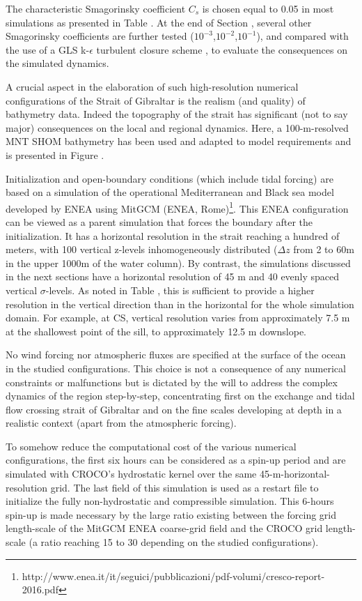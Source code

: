 The characteristic Smagorinsky coefficient $C_s$ is chosen equal to 0.05 in most simulations as presented in Table . At the end of Section , several other Smagorinsky coefficients are further tested  ($10^{-3}$,$10^{-2}$,$10^{-1}$), and compared with the use of a GLS k-$\epsilon$ turbulent closure scheme \citep{umlauf_2003}, to evaluate the consequences on the simulated dynamics.

A crucial aspect in the elaboration of such high-resolution numerical configurations of the Strait of Gibraltar is the realism (and quality) of bathymetry data. Indeed the topography of the strait has significant (not to say major) consequences on the local and regional dynamics. Here, a 100-m-resolved MNT SHOM bathymetry has been used and adapted to model requirements and is presented in Figure .

Initialization and open-boundary conditions (which include tidal forcing) are based on a simulation of the operational Mediterranean and Black sea model developed by ENEA using MitGCM (ENEA, Rome)\footnote{http://www.enea.it/it/seguici/pubblicazioni/pdf-volumi/cresco-report-2016.pdf}. This ENEA configuration can be viewed as a parent simulation that forces the boundary after the initialization. It has a horizontal resolution in the strait reaching a hundred of meters, with 100 vertical z-levels inhomogeneously distributed ($\Delta z$ from 2 to 60m in the upper 1000m of the water column). By contrast, the simulations discussed in the next sections have a horizontal resolution of 45 m and 40 evenly spaced vertical $\sigma$-levels. As noted in Table , this is sufficient to provide a higher resolution in the vertical direction than in the horizontal for the whole simulation domain. For example, at CS, vertical resolution varies from approximately 7.5 m at the shallowest point of the sill, to approximately 12.5 m downslope.

No wind forcing nor atmospheric fluxes are specified at the surface of the ocean in the studied configurations. This choice is not a consequence of any numerical constraints or malfunctions but is dictated by the will to address the complex dynamics of the region step-by-step, concentrating first on the exchange and tidal flow crossing strait of Gibraltar and on the fine scales developing at depth in a realistic context (apart from the atmospheric forcing).

To somehow reduce the computational cost of the various numerical configurations, the first six hours can be considered as a spin-up period and are simulated with CROCO's hydrostatic kernel over the same 45-m-horizontal-resolution grid. The last field of this simulation is used as a restart file to initialize the fully non-hydrostatic and compressible simulation. This 6-hours spin-up is made necessary by the large ratio existing between the forcing grid length-scale of the MitGCM ENEA coarse-grid field and the CROCO grid length-scale (a ratio reaching 15 to 30 depending on the studied configurations). 

